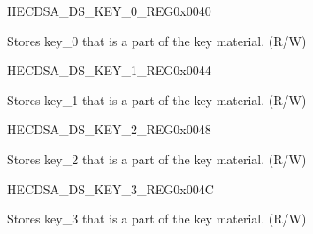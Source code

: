 \begin{register}{H}{ECDSA\_DS\_KEY\_0\_REG}{0x0040}\label{regdesc:ECDSADSKEY0REG}
%
\regnewline%
\begin{regdesc}\begin{reglist}
\label{fielddesc:ECDSADSKEY0}\item [ECDSA\_DS\_KEY\_0] Stores key\_0 that is a part of the key material. (R/W)
\end{reglist}\end{regdesc}
\end{register}


\begin{register}{H}{ECDSA\_DS\_KEY\_1\_REG}{0x0044}\label{regdesc:ECDSADSKEY1REG}
%
\regnewline%
\begin{regdesc}\begin{reglist}
\label{fielddesc:ECDSADSKEY1}\item [ECDSA\_DS\_KEY\_1] Stores key\_1 that is a part of the key material. (R/W)
\end{reglist}\end{regdesc}
\end{register}


\begin{register}{H}{ECDSA\_DS\_KEY\_2\_REG}{0x0048}\label{regdesc:ECDSADSKEY2REG}
%
\regnewline%
\begin{regdesc}\begin{reglist}
\label{fielddesc:ECDSADSKEY2}\item [ECDSA\_DS\_KEY\_2] Stores key\_2 that is a part of the key material. (R/W)
\end{reglist}\end{regdesc}
\end{register}


\begin{register}{H}{ECDSA\_DS\_KEY\_3\_REG}{0x004C}\label{regdesc:ECDSADSKEY3REG}
%
\regnewline%
\begin{regdesc}\begin{reglist}
\label{fielddesc:ECDSADSKEY3}\item [ECDSA\_DS\_KEY\_3] Stores key\_3 that is a part of the key material. (R/W)
\end{reglist}\end{regdesc}
\end{register}


